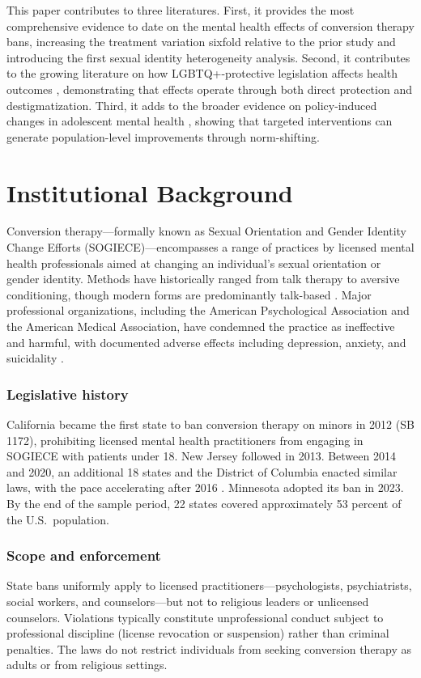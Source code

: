 \documentclass[12pt]{article}
\begin{document}
This paper contributes to three literatures. First, it provides the most comprehensive evidence to date on the mental health effects of conversion therapy bans, increasing the treatment variation sixfold relative to the prior study and introducing the first sexual identity heterogeneity analysis. Second, it contributes to the growing literature on how LGBTQ+-protective legislation affects health outcomes \citep{hatzenbuehler2010,raifman2017,carpenter2021}, demonstrating that effects operate through both direct protection and destigmatization. Third, it adds to the broader evidence on policy-induced changes in adolescent mental health \citep{gruber2004}, showing that targeted interventions can generate population-level improvements through norm-shifting.

\section{Institutional Background}

Conversion therapy---formally known as Sexual Orientation and Gender Identity Change Efforts (SOGIECE)---encompasses a range of practices by licensed mental health professionals aimed at changing an individual's sexual orientation or gender identity. Methods have historically ranged from talk therapy to aversive conditioning, though modern forms are predominantly talk-based \citep{blosnich2018}. Major professional organizations, including the American Psychological Association \citep{apa2009} and the American Medical Association, have condemned the practice as ineffective and harmful, with documented adverse effects including depression, anxiety, and suicidality \citep{ryan2010,green2020}.

\subsubsection*{Legislative history} California became the first state to ban conversion therapy on minors in 2012 (SB 1172), prohibiting licensed mental health practitioners from engaging in SOGIECE with patients under 18. New Jersey followed in 2013. Between 2014 and 2020, an additional 18 states and the District of Columbia enacted similar laws, with the pace accelerating after 2016 \citep{map2024}. Minnesota adopted its ban in 2023. By the end of the sample period, 22 states covered approximately 53 percent of the U.S.\ population.

\subsubsection*{Scope and enforcement} State bans uniformly apply to licensed practitioners---psychologists, psychiatrists, social workers, and counselors---but not to religious leaders or unlicensed counselors. Violations typically constitute unprofessional conduct subject to professional discipline (license revocation or suspension) rather than criminal penalties. The laws do not restrict individuals from seeking conversion therapy as adults or from religious settings.
\end{document}
